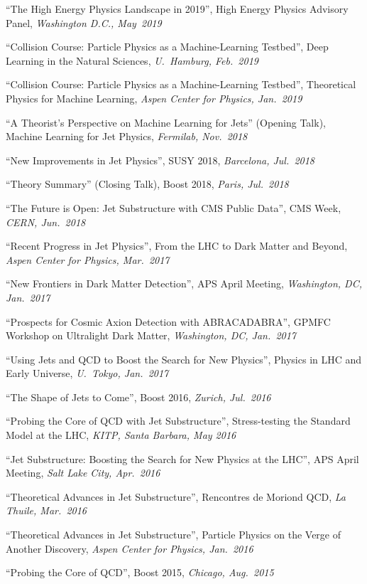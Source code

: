 \documentclass[11pt]{article}
\begin{document}
\item ``The High Energy Physics Landscape in 2019'', High Energy Physics Advisory Panel, \textit{Washington D.C., May~2019}
\item ``Collision Course: Particle Physics as a Machine-Learning Testbed'', Deep Learning in the Natural Sciences, \textit{U.~Hamburg, Feb.~2019}
\item ``Collision Course: Particle Physics as a Machine-Learning Testbed'', Theoretical Physics for Machine Learning, \textit{Aspen Center for Physics, Jan.~2019}
\item ``A Theorist's Perspective on Machine Learning for Jets'' (Opening Talk), Machine Learning for Jet Physics, \textit{Fermilab, Nov.~2018}
\item ``New Improvements in Jet Physics'', SUSY 2018, \textit{Barcelona, Jul.~2018}
\item ``Theory Summary'' (Closing Talk), Boost 2018, \textit{Paris, Jul.~2018}
\item ``The Future is Open: Jet Substructure with CMS Public Data'', CMS Week, \textit{CERN, Jun.~2018}
\item ``Recent Progress in Jet Physics'', From the LHC to Dark Matter and Beyond, \textit{Aspen Center for Physics, Mar.~2017}
\item ``New Frontiers in Dark Matter Detection'', APS April Meeting, \textit{Washington, DC, Jan.~2017}
\item ``Prospects for Cosmic Axion Detection with ABRACADABRA'', GPMFC Workshop on Ultralight Dark Matter, \textit{Washington, DC, Jan.~2017}
\item ``Using Jets and QCD to Boost the Search for New Physics'', Physics in LHC and Early Universe, \textit{U.~Tokyo, Jan.~2017}
\item ``The Shape of Jets to Come'', Boost 2016, \textit{Zurich, Jul.~2016}
\item ``Probing the Core of QCD with Jet Substructure'', Stress-testing the Standard Model at the LHC, \textit{KITP, Santa Barbara, May 2016}
\item ``Jet Substructure: Boosting the Search for New Physics at the LHC'', APS April Meeting, \textit{Salt Lake City, Apr.~2016}
\item ``Theoretical Advances in Jet Substructure'', Rencontres de Moriond QCD, \textit{La Thuile, Mar.~2016}
\item ``Theoretical Advances in Jet Substructure'', Particle Physics on the Verge of Another Discovery, \textit{Aspen Center for Physics, Jan.~2016}
\item ``Probing the Core of QCD'', Boost 2015, \textit{Chicago, Aug.~2015}
\end{document}
